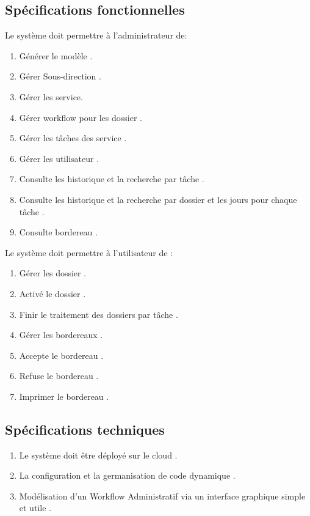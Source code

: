  \subsection{Spécifications fonctionnelles }
  Le système doit permettre à l’administrateur  de:
 \begin{enumerate}
\item  	    Générer le modèle .
\item  	    Gérer Sous-direction .
\item  	    Gérer les service.
\item  	    Gérer workflow pour les dossier  .
\item  	    Gérer les tâches des service . 
\item  	    Gérer les utilisateur .
\item  	    Consulte les historique  et la recherche par tâche .
\item  	    Consulte les historique  et la recherche par dossier et les jours pour chaque tâche .
\item  	    Consulte bordereau .
 \end{enumerate}
 Le système doit permettre à l’utilisateur   de :
 \begin{enumerate}
\item  	    Gérer les dossier .
\item  	    Activé le dossier    .
\item  	    Finir le traitement des dossiers par tâche    .
\item  	    Gérer les  bordereaux  .
\item  	    Accepte le  bordereau  .
\item  	    Refuse  le  bordereau  .
\item  	    Imprimer le  bordereau  .

 \end{enumerate}
 
 
 
 
  \subsection{Spécifications techniques }
 
 
 
  \begin{enumerate}
 	\item  	   Le système doit être déployé sur le cloud  .
 	\item  	   La configuration et la germanisation de code dynamique . 
 	\item  	   Modélisation d'un Workflow Administratif via un interface graphique simple et utile . 
 	
 
 	
 \end{enumerate}
 
